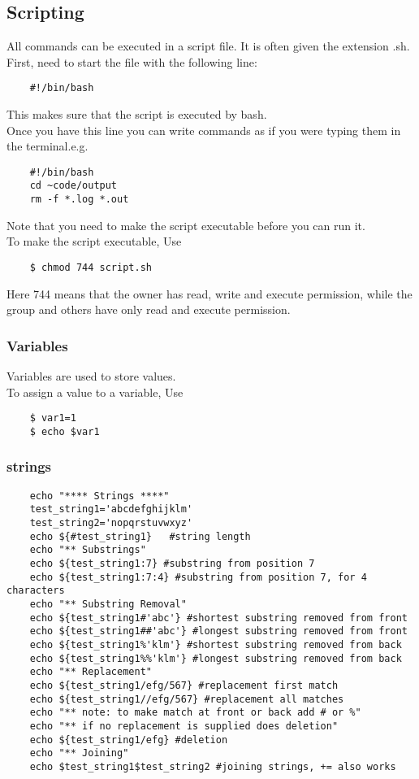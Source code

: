 \documentclass[12pt,a4paper]{article}
\begin{document}
\subsection{Scripting}
All commands can be executed in a script file. It is often given the extension .sh.\\
First, need to start the file with the following line:
\begin{lstlisting}
    #!/bin/bash
\end{lstlisting}
This makes sure that the script is executed by bash.\\
Once you have this line you can write commands as if you were typing them in the terminal.e.g.\\
\begin{lstlisting}
    #!/bin/bash
    cd ~code/output
    rm -f *.log *.out
\end{lstlisting}
Note that you need to make the script executable before you can run it.\\
To make the script executable, Use
\begin{lstlisting}
    $ chmod 744 script.sh
\end{lstlisting}
Here 744 means that the owner has read, write and execute permission, while the group and others have only read and execute permission.\\
\subsubsection{Variables}
Variables are used to store values.\\
To assign a value to a variable, Use
\begin{lstlisting}
    $ var1=1
    $ echo $var1
\end{lstlisting}
\subsubsection{strings}
\begin{lstlisting}
    echo "**** Strings ****"
    test_string1='abcdefghijklm'
    test_string2='nopqrstuvwxyz'
    echo ${#test_string1}   #string length
    echo "** Substrings"
    echo ${test_string1:7} #substring from position 7
    echo ${test_string1:7:4} #substring from position 7, for 4 characters
    echo "** Substring Removal"
    echo ${test_string1#'abc'} #shortest substring removed from front
    echo ${test_string1##'abc'} #longest substring removed from front
    echo ${test_string1%'klm'} #shortest substring removed from back
    echo ${test_string1%%'klm'} #longest substring removed from back
    echo "** Replacement"
    echo ${test_string1/efg/567} #replacement first match
    echo ${test_string1//efg/567} #replacement all matches
    echo "** note: to make match at front or back add # or %"
    echo "** if no replacement is supplied does deletion"
    echo ${test_string1/efg} #deletion
    echo "** Joining"
    echo $test_string1$test_string2 #joining strings, += also works
\end{lstlisting}
\end{document}
